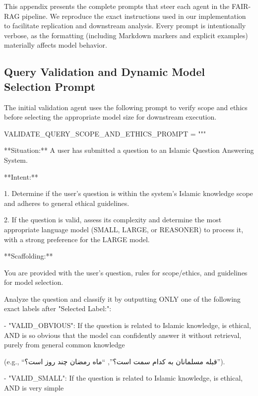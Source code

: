 \documentclass[11pt]{article}
\newcommand{\fa}[1]{\textfarsi{#1}}
\begin{document}
This appendix presents the complete prompts that steer each agent in the FAIR-RAG pipeline. We reproduce the exact instructions used in our implementation to facilitate replication and downstream analysis. Every prompt is intentionally verbose, as the formatting (including Markdown markers and explicit examples) materially affects model behavior.

\subsection{Query Validation and Dynamic Model Selection Prompt}

The initial validation agent uses the following prompt to verify scope and ethics before selecting the appropriate model size for downstream execution.

\begin{PromptBlock}
VALIDATE_QUERY_SCOPE_AND_ETHICS_PROMPT = """

**Situation:** A user has submitted a question to an Islamic Question Answering System.

**Intent:**

1. Determine if the user's question is within the system's Islamic knowledge scope and adheres to general ethical guidelines.

2. If the question is valid, assess its complexity and determine the most appropriate language model (SMALL, LARGE, or REASONER) to process it, with a strong preference for the LARGE model.

**Scaffolding:**

You are provided with the user's question, rules for scope/ethics, and guidelines for model selection.

Analyze the question and classify it by outputting ONLY one of the following exact labels after "Selected Label:":

- "VALID_OBVIOUS": If the question is related to Islamic knowledge, is ethical, AND is so obvious that the model can confidently answer it without retrieval, purely from general common knowledge
\end{PromptBlock}

\fa{(e.g., ``قبله مسلمانان به کدام سمت است؟'', ``ماه رمضان چند روز است؟'').}

\begin{PromptBlock}

- "VALID_SMALL": If the question is related to Islamic knowledge, is ethical, AND is very simple
\end{PromptBlock}
\end{document}
